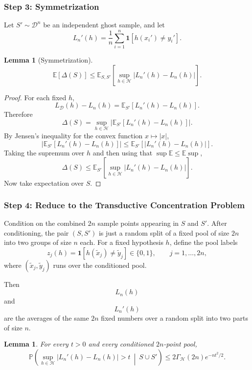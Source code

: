 \documentclass{article}
\newtheorem{lemma}[theorem]{Lemma}
\theoremstyle{definition}
\theoremstyle{remark}
\newcommand{\EE}{\mathbb{E}}
\newcommand{\PP}{\mathbb{P}}
\newcommand{\cH}{\mathcal{H}}
\newcommand{\cD}{\mathcal{D}}
\newcommand{\ind}{\mathbf{1}}
\begin{document}
\subsubsection{Step 3: Symmetrization}

Let $S' \sim \cD^n$ be an independent ghost sample, and let
$$
L_n'(h) = \frac{1}{n}\sum_{i=1}^n \ind[h(x_i')\ne y_i'].
$$

\begin{lemma}[Symmetrization]
\label{lem:symmetrization}
$$
\EE[\Delta(S)]
\le
\EE_{S,S'}\!\left[
\sup_{h\in\cH} |L_n'(h)-L_n(h)|
\right].
$$
\end{lemma}

\begin{proof}
For each fixed $h$,
$$
L_{\cD}(h)-L_n(h) = \EE_{S'}[L_n'(h)-L_n(h)].
$$
Therefore
$$
\Delta(S)
=
\sup_{h\in\cH} \left| \EE_{S'}[L_n'(h)-L_n(h)] \right|.
$$
By Jensen's inequality for the convex function $x \mapsto |x|$,
$$
\left| \EE_{S'}[L_n'(h)-L_n(h)] \right|
\le
\EE_{S'}\!\left[ |L_n'(h)-L_n(h)| \right].
$$
Taking the supremum over $h$ and then using that $\sup \EE \le \EE \sup$,
$$
\Delta(S)
\le
\EE_{S'}\!\left[
\sup_{h\in\cH} |L_n'(h)-L_n(h)|
\right].
$$
Now take expectation over $S$.
\end{proof}

\subsubsection{Step 4: Reduce to the Transductive Concentration Problem}

Condition on the combined $2n$ sample points appearing in $S$ and $S'$. After conditioning, the pair $(S,S')$ is just a random split of a fixed pool of size $2n$ into two groups of size $n$ each. For a fixed hypothesis $h$, define the pool labels
$$
z_j(h) = \ind[h(\widetilde{x}_j)\ne \widetilde{y}_j] \in \{0,1\},
\qquad j=1,\dots,2n,
$$
where $(\widetilde{x}_j,\widetilde{y}_j)$ runs over the conditioned pool.

Then
$$
L_n(h)
$$
and
$$
L_n'(h)
$$
are the averages of the same $2n$ fixed numbers over a random split into two parts of size $n$.

\begin{lemma}
\label{lem:conditional-tail}
For every $t>0$ and every conditioned $2n$-point pool,
$$
\PP\!\left(
\sup_{h\in\cH} |L_n'(h)-L_n(h)| > t
\ \middle|\
S \cup S'
\right)
\le
2\Gamma_{\cH}(2n)e^{-nt^2/2}.
$$
\end{lemma}
\end{document}
